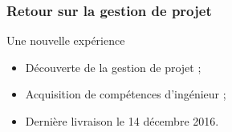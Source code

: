 \begin{frame}
\frametitle{Retour sur la gestion de projet}
	\begin{block}{Une nouvelle expérience}
		\begin{itemize}
			\item Découverte de la gestion de projet ;
			\item Acquisition de compétences d'ingénieur ;
			\item Dernière livraison le 14 décembre 2016.
		\end{itemize}      
	\end{block}
\end{frame}